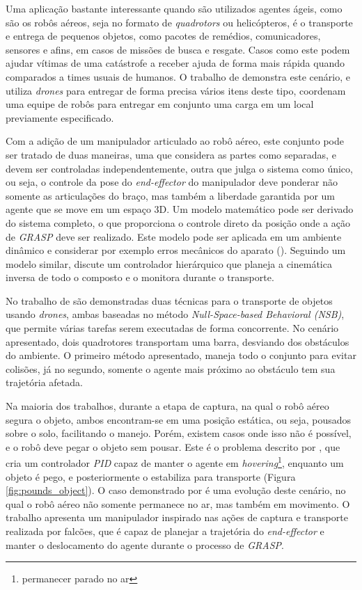Uma aplicação bastante interessante quando são utilizados agentes ágeis, como são os robôs aéreos, seja no formato de \emph{quadrotors} ou helicópteros, é o transporte e entrega de pequenos objetos, como pacotes de remédios, comunicadores, sensores e afins, em casos de missões de busca e resgate. Casos como este podem ajudar vítimas de uma catástrofe a receber ajuda de forma mais rápida quando comparados a times usuais de humanos. O trabalho de \cite{Bernard2011} demonstra este cenário, e utiliza \emph{drones} para entregar de forma precisa vários itens deste tipo, \cite{Maza2010} coordenam uma equipe de robôs para entregar em conjunto uma carga em um local previamente especificado.

Com a adição de um manipulador articulado ao robô aéreo, este conjunto pode ser tratado de duas maneiras, uma que considera as partes como separadas, e devem ser controladas independentemente, outra que julga o sistema como único, ou seja, o controle da pose do \emph{end-effector} do manipulador deve ponderar não somente as articulações do braço, mas também a liberdade garantida por um agente que se move em um espaço 3D.
Um modelo matemático pode ser derivado do sistema completo, o que proporciona o controle direto da posição onde a ação de \emph{GRASP} deve ser realizado. Este modelo pode ser aplicada em um ambiente dinâmico e considerar por exemplo erros mecânicos do aparato (\cite{Orsag2013, Kim2013}).
Seguindo um modelo similar, \cite{Arleo2013} discute um controlador hierárquico que planeja a cinemática inversa de todo o composto e o monitora durante o transporte.

No trabalho de \cite{Baizid2014} são demonstradas duas técnicas para o transporte de objetos usando \emph{drones}, ambas baseadas no método \emph{Null-Space-based Behavioral (NSB)}, que permite várias tarefas serem executadas de forma concorrente.
No cenário apresentado, dois quadrotores transportam uma barra, desviando dos obstáculos do ambiente. O primeiro método apresentado, maneja todo o conjunto para evitar colisões, já no segundo, somente o agente mais próximo ao obstáculo tem sua trajetória afetada.

Na maioria dos trabalhos, durante a etapa de captura, na qual o robô aéreo segura o objeto, ambos encontram-se em uma posição estática, ou seja, pousados sobre o solo, facilitando o manejo. Porém, existem casos onde isso não é possível, e o robô deve pegar o objeto sem pousar.
Este é o problema descrito por \cite{Pounds2011}, que cria um controlador \emph{PID} capaz de manter o agente em \emph{hovering}\footnote{permanecer parado no ar}, enquanto um objeto é pego, e posteriormente o estabiliza para transporte (Figura \ref{fig:pounds_object}).
O caso demonstrado por \cite{Thomas2014} é uma evolução deste cenário, no qual o robô aéreo não somente permanece no ar, mas também em movimento. O trabalho apresenta um manipulador inspirado nas ações de captura e transporte realizada por falcões, que é capaz de planejar a trajetória do \emph{end-effector} e manter o deslocamento do agente durante o processo de \emph{GRASP}.

